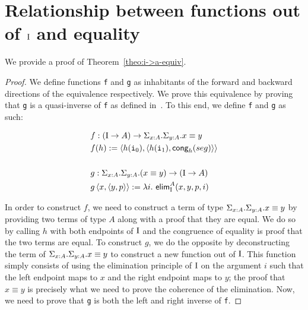 \documentclass[12pt,twoside,maitrise]{dms}
\theoremstyle{definition}
\numberwithin{equation}{section}
\numberwithin{table}{chapter}
\numberwithin{figure}{chapter}
\newcommand\kw[1] {\textsf{#1}}
\newcommand\id[1] {\texttt{#1}}
\newcommand\fn[1] {\texttt{#1}}
\begin{document}
\section{Relationship between functions out of $\mathrm{I}$ and equality}\label{app:proof-i->a-equiv}

We provide a proof of Theorem~\ref{theo:i->a-equiv}.

\begin{proof}
We define functions \id{f} and \id{g} as inhabitants of the forward and backward
directions of the equivalence respectively. We prove this equivalence by proving
that \fn{g} is a quasi-inverse of \fn{f} as defined in~\cite[Chap.
  2]{HoTTbook}. To this end, we define \id{f} and \id{g} as such:

\begin{align*}
  & f : (\bI \rightarrow A) \rightarrow \Sigma_{\oftype{x}{A}} . \Sigma_{\oftype{y}{A}} . \eqtype{x}{y} \\
  & f(h) := \braket{h(\ileft), \braket{h(\iright), \kw{cong}_{h}(seg)}} \\ \\
  & g : \Sigma_{\oftype{x}{A}} . \Sigma_{\oftype{y}{A}} . (\eqtype{x}{y}) \rightarrow  (\bI \rightarrow A) \\
  & g \braket{x, \braket{y, p}} := \lambda i . \ \kw{elim}_{\bI}^{A}(x, y, p, i)
\end{align*}

In order to construct $f$, we need to construct a term of type
$\Sigma_{\oftype{x}{A}} . \Sigma_{\oftype{y}{A}} . \eqtype{x}{y}$ by providing
two terms of type $A$ along with a proof that they are equal. We do so by
calling $h$ with both endpoints of $\mathrm{I}$ and the congruence of equality is proof
that the two terms are equal. To construct $g$, we do the opposite by
deconstructing the term of $\Sigma_{\oftype{x}{A}} . \Sigma_{\oftype{y}{A}} .
\eqtype{x}{y}$ to construct a new function out of $\mathrm{I}$. This function simply
consists of using the elimination principle of $\mathrm{I}$ on the argument $i$ such
that the left endpoint maps to $x$ and the right endpoint maps to $y$; the proof
that $x \equiv y$ is precisely what we need to prove the coherence of the
elimination. Now, we need to prove that \id{g} is both the left and right
inverse of \id{f}.


\end{proof}
\end{document}
